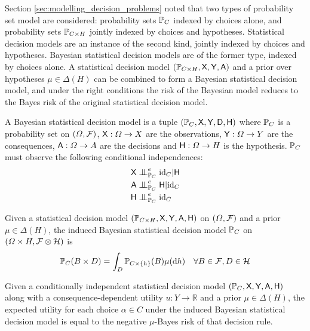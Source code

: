 Section \ref{sec:modelling_decision_problems} noted that two types of probability set model are considered: probability sets $\mathbb{P}_C$ indexed by choices alone, and probability sets $\mathbb{P}_{C\times H}$ jointly indexed by choices and hypotheses. Statistical decision models are an instance of the second kind, jointly indexed by choices and hypotheses. Bayesian statistical decision models are of the former type, indexed by choices alone. A statistical decision model $(\mathbb{P}_{C\times H}, \mathsf{X},\mathsf{Y},\mathsf{A})$ and a prior over hypotheses $\mu\in \Delta(H)$ can be combined to form a Bayesian statistical decision model, and under the right conditions the risk of the Bayesian model reduces to the Bayes risk of the original statistical decision model.

\begin{definition}
A Bayesian statistical decision model is a tuple $(\mathbb{P}_{C}, \mathsf{X},\mathsf{Y},\mathsf{D},\mathsf{H})$ where $\mathbb{P}_C$ is a probability set on $(\Omega,\mathcal{F})$, $\mathsf{X}:\Omega\to X$ are the observations, $\mathsf{Y}:\Omega\to Y$ are the consequences, $\mathsf{A}:\Omega\to A$ are the decisions and $\mathsf{H}:\Omega\to H$ is the hypothesis. $\mathbb{P}_C$ must observe the following conditional independences:
\begin{align}
    \RV{X}&\CI^e_{\prob{P}_{C}} \text{id}_C|\RV{H}\\
    \RV{A}&\CI^e_{\prob{P}_{C}} \RV{H}|\text{id}_C\\
    \RV{H}&\CI^e_{\prob{P}_C} \text{id}_C
\end{align}
\end{definition}

\begin{definition}
Given a statistical decision model $(\mathbb{P}_{C\times H}, \mathsf{X},\mathsf{Y},\mathsf{A},\mathsf{H})$ on $(\Omega,\mathcal{F})$ and a prior $\mu\in \Delta(H)$, the induced Bayesian statistical decision model $\mathbb{P}_C$ on $(\Omega\times H,\mathcal{F}\otimes \mathcal{H})$ is
\begin{align}
    \mathbb{P}_C(B\times D) &= \int_{D} \mathbb{P}_{C\times \{h\}}(B)\mu(\mathrm{d}h)&\forall B\in \mathcal{F}, D\in\mathcal{H}
\end{align}
\end{definition}

\begin{theorem}
Given a conditionally independent statistical decision model $(\mathbb{P}_{C}, \mathsf{X},\mathsf{Y},\mathsf{A},\mathsf{H})$ along with a consequence-dependent utility $u:Y\to \mathbb{R}$ and a prior $\mu\in \Delta(H)$, the expected utility for each choice $\alpha\in C$ under the induced Bayesian statistical decision model is equal to the negative $\mu$-Bayes risk of that decision rule.
\end{theorem}


